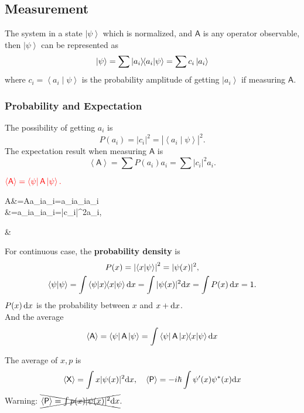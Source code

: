 \documentclass{article}
\def\d{{\rm d}}
\def\id{\,\d}%
\def\sA{\mathsf A}\def\sB{\mathsf B}\def\sC{\mathsf C}\def\sX{\mathsf X}\def\sP{\mathsf P}\def\sH{\mathsf H}\def\sK{\mathsf K}\def\sL{\mathsf L}\def\sS{\mathsf S}\def\sM{\mathsf M}\def\sT{\mathsf T}
\newcommand{\ko}[1]{\hspace{-#1 pt}}%
\newcommand{\ave}[1]{\left\langle #1\right\rangle}%
\newcommand{\bra}[1]{\left\langle #1\right\vert}
\newcommand{\ket}[1]{\left\vert #1\right\rangle}
\newcommand{\brkt}[2]{\left\langle #1\middle\vert#2\right\rangle}
\newcommand{\spark}[1]{\textcolor{red}{#1}}
\begin{document}
\subsection{Measurement}
The system in a state $\ket\psi$ which is normalized, and $\sA$ is any operator observable,
then $\ket\psi$ can be represented as
$$\ket\psi=\sum\ket{a_i}\ko3\brkt{a_i}\psi=\sum c_i\ket{a_i}$$
where $c_i=\brkt{a_i}\psi$ is the probability amplitude of getting $\ket{a_i}$ if measuring $\sA$.
\subsubsection{Probability and Expectation}
The possibility of getting $a_i$ is
$$P(a_i)=|c_i|^2=\left\lvert\brkt{a_i}\psi\right\rvert^2.$$
The expectation result when measuring $\sA$ is
$$\ave\sA=\sum P(a_i)a_i=\sum|c_i|^2a_i.$$
\begin{theorem}{}{}
	\centering$\spark{\ave\sA=\bra\psi\sA\ket\psi.}$
	\begin{flalign*}
		\begin{split}
			\bra\psi\sA\ket\psi&=\sum\bra\psi\sA\ket{a_i}\ko3\brkt{a_i}\psi=\sum\bra\psi a_i\ket{a_i}\ko3\brkt{a_i}\psi\\
			&=\sum a_i\brkt\psi{a_i}\brkt{a_i}\psi=\sum|c_i|^2a_i,
		\end{split}&
	\end{flalign*}
\end{theorem}
For continuous case, the \textbf{probability density} is
\begin{gather*}
	P(x)=\left\lvert\brkt x\psi\right\rvert^2=|\psi(x)|^2,\\
	\brkt\psi\psi=\int\brkt\psi{x}\ko3\brkt x\psi\d x=\int|\psi(x)|^2\d x=\int P(x)\id x=1.
\end{gather*}
$P(x)\id x$ is the probability between $x$ and $x+\d x$.\\
And the average
$$\ave\sA=\bra\psi\sA\ket\psi=\int\bra\psi\sA\ket x\ko3\brkt x\psi\d x$$
\begin{example}{}{}
	The average of $x,p$ is
	$$\ave\sX=\int x|\psi(x)|^2\d x,\quad\ave\sP=-i\hbar\int\psi'(x) \psi^*(x)\d x$$
	Warning: $\xcancel{\ave\sP=\int p(x)|\psi(x)|^2\d x}$.
\end{example}
\end{document}

